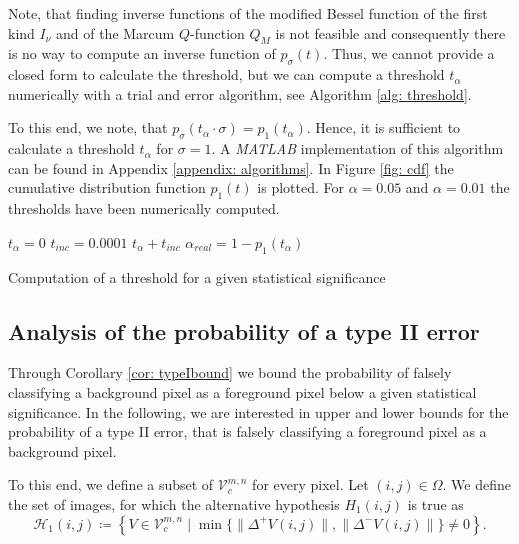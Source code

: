 \documentclass[a4paper,12pt]{article}
\newcommand{\norm}[1]{\lVert#1\rVert}
\theoremstyle{plain}
\theoremstyle{definition}
\begin{document}
Note, that finding inverse functions of the modified Bessel function of the first kind $I_\nu$ and of the Marcum $Q$-function $Q_M$ is not feasible and consequently there is no way to compute an inverse function of $p_\sigma(t)$. Thus, we cannot provide a closed form to calculate the threshold, but we can compute a threshold $t_\alpha$ numerically with a trial and error algorithm, see Algorithm \ref{alg: threshold}.

To this end, we note, that $p_\sigma(t_\alpha \cdot \sigma) = p_1(t_\alpha)$. Hence, it is sufficient to calculate a threshold $t_\alpha$ for $\sigma = 1$. A \emph{MATLAB} implementation of this algorithm can be found in Appendix \ref{appendix: algorithms}. In Figure \ref{fig: cdf} the cumulative distribution function $p_1(t)$ is plotted. For $\alpha = 0.05$ and $\alpha = 0.01$ the thresholds have been numerically computed.\\

\begin{algorithm}[H]
	$t_\alpha = 0$\;
	$t_{inc} = 0.0001$\;
	{
		$t_\alpha + t_{inc}$\;
		$\alpha_{real} = 1 - p_1(t_\alpha)$\;
	}
	\caption{Computation of a threshold for a given statistical significance}
	\label{alg: threshold}
\end{algorithm}





\subsection{Analysis of the probability of a type II error}\label{section: analyzetypeIIerror}

Through Corollary \eqref{cor: typeIbound} we bound the probability of falsely classifying a background pixel as a foreground pixel below a given statistical significance. In the following, we are interested in upper and lower bounds for the probability of a type II error, that is falsely classifying a foreground pixel as a background pixel.

To this end, we define a subset of $\mathcal{V}_c^{m, n}$ for every pixel. Let $(i, j) \in \Omega$. We define the set of images, for which the alternative hypothesis $H_1(i, j)$ is true as
\begin{equation}\label{setH1}
	\mathcal{H}_1(i, j) \coloneqq \left\{ V \in \mathcal{V}_c^{m, n} \mid \min \{ \norm{\Delta^+ V(i, j)}, \norm{\Delta^- V(i, j)} \} \neq 0 \right\}.
\end{equation}
\end{document}
